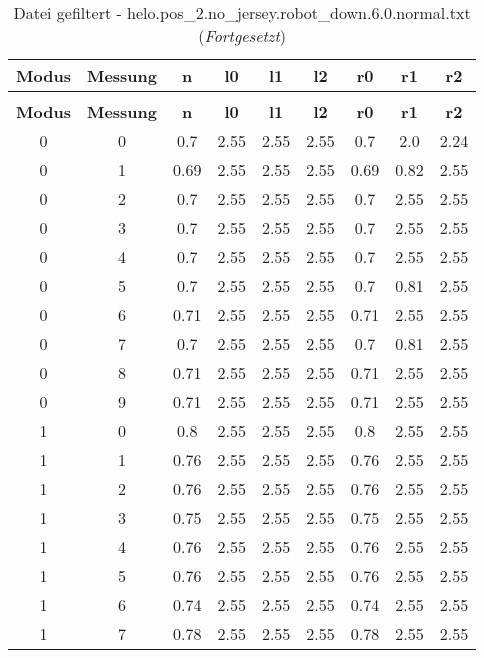 \begin{longtable}{|c|c||c||c|c|c||c|c|c|}
	\caption{Datei gefiltert - helo.pos\_2.no\_jersey.robot\_down.6.0.normal.txt} \label{tab:helo.pos-2.no-jersey.robot-down.6.0.normal.txt} \\ \hline
	\textbf{Modus} & \textbf{Messung} & \textbf{n} & \textbf{l0} & \textbf{l1} & \textbf{l2} & \textbf{r0} & \textbf{r1} & \textbf{r2}\\ \hline
	\endfirsthead
	\caption[]{Datei gefiltert - helo.pos\_2.no\_jersey.robot\_down.6.0.normal.txt (\emph{Fortgesetzt})} \\ \hline
	\textbf{Modus} & \textbf{Messung} & \textbf{n} & \textbf{l0} & \textbf{l1} & \textbf{l2} & \textbf{r0} & \textbf{r1} & \textbf{r2}\\ \hline
	\endhead
	0 & 0 & 0.7 & 2.55 & 2.55 & 2.55 & 0.7 & 2.0 & 2.24 \\ \hline
	0 & 1 & 0.69 & 2.55 & 2.55 & 2.55 & 0.69 & 0.82 & 2.55 \\ \hline
	0 & 2 & 0.7 & 2.55 & 2.55 & 2.55 & 0.7 & 2.55 & 2.55 \\ \hline
	0 & 3 & 0.7 & 2.55 & 2.55 & 2.55 & 0.7 & 2.55 & 2.55 \\ \hline
	0 & 4 & 0.7 & 2.55 & 2.55 & 2.55 & 0.7 & 2.55 & 2.55 \\ \hline
	0 & 5 & 0.7 & 2.55 & 2.55 & 2.55 & 0.7 & 0.81 & 2.55 \\ \hline
	0 & 6 & 0.71 & 2.55 & 2.55 & 2.55 & 0.71 & 2.55 & 2.55 \\ \hline
	0 & 7 & 0.7 & 2.55 & 2.55 & 2.55 & 0.7 & 0.81 & 2.55 \\ \hline
	0 & 8 & 0.71 & 2.55 & 2.55 & 2.55 & 0.71 & 2.55 & 2.55 \\ \hline
	0 & 9 & 0.71 & 2.55 & 2.55 & 2.55 & 0.71 & 2.55 & 2.55 \\ \hline
	1 & 0 & 0.8 & 2.55 & 2.55 & 2.55 & 0.8 & 2.55 & 2.55 \\ \hline
	1 & 1 & 0.76 & 2.55 & 2.55 & 2.55 & 0.76 & 2.55 & 2.55 \\ \hline
	1 & 2 & 0.76 & 2.55 & 2.55 & 2.55 & 0.76 & 2.55 & 2.55 \\ \hline
	1 & 3 & 0.75 & 2.55 & 2.55 & 2.55 & 0.75 & 2.55 & 2.55 \\ \hline
	1 & 4 & 0.76 & 2.55 & 2.55 & 2.55 & 0.76 & 2.55 & 2.55 \\ \hline
	1 & 5 & 0.76 & 2.55 & 2.55 & 2.55 & 0.76 & 2.55 & 2.55 \\ \hline
	1 & 6 & 0.74 & 2.55 & 2.55 & 2.55 & 0.74 & 2.55 & 2.55 \\ \hline
	1 & 7 & 0.78 & 2.55 & 2.55 & 2.55 & 0.78 & 2.55 & 2.55 \\ \hline

\end{longtable}

